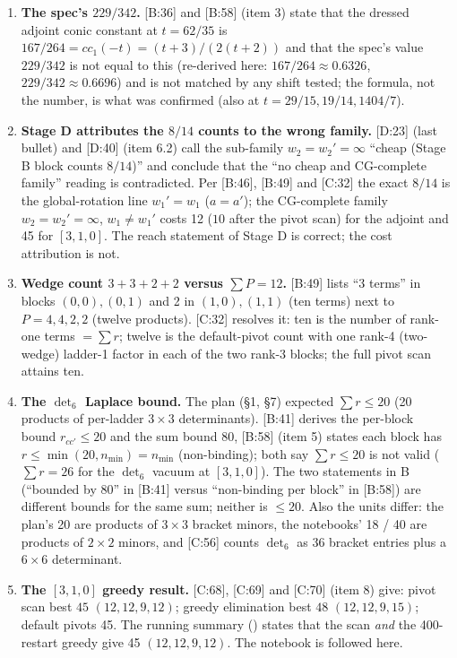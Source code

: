 \documentclass[10pt]{article}
\newcommand{\nb}[1]{\texttt{\path{#1}}}
\newcommand{\cl}[2]{\textsf{[#1:#2]}}
\begin{document}
\begin{enumerate}\setlength{\itemsep}{2pt}
\item \textbf{The spec's $229/342$.} \cl{B}{36} and \cl{B}{58} (item 3) state that the dressed adjoint conic constant at $t=62/35$ is $167/264=cc_1(-t)=(t+3)/(2(t+2))$ and that the spec's value $229/342$ is not equal to this (re-derived here: $167/264\approx0.6326$, $229/342\approx0.6696$) and is not matched by any shift tested; the formula, not the number, is what was confirmed (also at $t=29/15,19/14,1404/7$).
\item \textbf{Stage D attributes the $8/14$ counts to the wrong family.} \cl{D}{23} (last bullet) and \cl{D}{40} (item 6.2) call the sub-family $w_2=w_2'=\infty$ ``cheap (Stage B block counts $8/14$)'' and conclude that the ``no cheap and CG-complete family'' reading is contradicted. Per \cl{B}{46}, \cl{B}{49} and \cl{C}{32} the exact $8/14$ is the global-rotation line $w_1'=w_1$ ($a=a'$); the CG-complete family $w_2=w_2'=\infty$, $w_1\neq w_1'$ costs 12 ($10$ after the pivot scan) for the adjoint and 45 for $[3,1,0]$. The reach statement of Stage D is correct; the cost attribution is not.
\item \textbf{Wedge count $3+3+2+2$ versus $\sum P=12$.} \cl{B}{49} lists ``3 terms'' in blocks $(0,0),(0,1)$ and 2 in $(1,0),(1,1)$ (ten terms) next to $P=4,4,2,2$ (twelve products). \cl{C}{32} resolves it: ten is the number of rank-one terms $=\sum r$; twelve is the default-pivot count with one rank-4 (two-wedge) ladder-1 factor in each of the two rank-3 blocks; the full pivot scan attains ten.
\item \textbf{The $\det_6$ Laplace bound.} The plan (\S1, \S7) expected $\sum r\le20$ (20 products of per-ladder $3\times3$ determinants). \cl{B}{41} derives the per-block bound $r_{cc'}\le20$ and the sum bound 80, \cl{B}{58} (item 5) states each block has $r\le\min(20,n_{\min})=n_{\min}$ (non-binding); both say $\sum r\le20$ is not valid ($\sum r=26$ for the $\det_6$ vacuum at $[3,1,0]$). The two statements in B (``bounded by 80'' in \cl{B}{41} versus ``non-binding per block'' in \cl{B}{58}) are different bounds for the same sum; neither is $\le20$. Also the units differ: the plan's 20 are products of $3\times3$ bracket minors, the notebooks' 18 / 40 are products of $2\times2$ minors, and \cl{C}{56} counts $\det_6$ as 36 bracket entries plus a $6\times6$ determinant.
\item \textbf{The $[3,1,0]$ greedy result.} \cl{C}{68}, \cl{C}{69} and \cl{C}{70} (item 8) give: pivot scan best $45$ $(12,12,9,12)$; greedy elimination best $48$ $(12,12,9,15)$; default pivots 45. The running summary (\nb{HANDOFF.md}) states that the scan \emph{and} the 400-restart greedy give 45 $(12,12,9,12)$. The notebook is followed here.

\end{enumerate}
\end{document}
